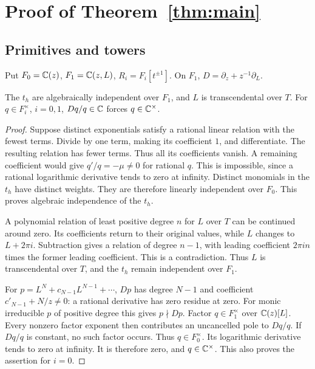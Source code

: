 \section{Proof of Theorem~\ref{thm:main}}\label{sec:proof}
\subsection{Primitives and towers}
Put $F_0=\mathbb{C}(z)$, $F_1=\mathbb{C}(z,L)$, $R_i=F_i[t^{\pm1}]$. On $F_1$, $D=\partial_z+z^{-1}\partial_L$.
\begin{lemma}\label{lem:exponential-log}
The $t_h$ are algebraically independent over $F_1$, and $L$ is
transcendental over $T$. For $q\in F_i^\times$, $i=0,1$,
$Dq/q\in\mathbb{C}$ forces $q\in\mathbb{C}^\times$.
\end{lemma}
\begin{proof}
Suppose distinct exponentials satisfy a rational linear relation with the
fewest terms. Divide by one term, making its coefficient $1$, and
differentiate. The resulting relation has fewer terms. Thus all its
coefficients vanish. A remaining coefficient would give
$q'/q=-\mu\ne0$ for rational $q$. This is impossible, since a rational
logarithmic derivative tends to zero at infinity. Distinct monomials in
the $t_h$ have distinct weights. They are therefore linearly independent
over $F_0$. This proves algebraic independence of the $t_h$.

A polynomial relation of least positive degree $n$ for $L$ over $T$
can be continued around zero. Its coefficients return to their original
values, while $L$ changes to $L+2\pi i$. Subtraction gives a relation of
degree $n-1$, with leading coefficient $2\pi in$ times the former leading
coefficient. This is a contradiction. Thus $L$ is transcendental over
$T$, and the $t_h$ remain independent over $F_1$.

For $p=L^N+c_{N-1}L^{N-1}+\cdots$, $Dp$ has degree $N-1$ and coefficient
$c'_{N-1}+N/z\ne0$: a rational derivative has zero residue at zero.
For monic irreducible $p$ of positive degree this gives $p\nmid Dp$.
Factor $q\in F_1^\times$ over $\mathbb{C}(z)[L]$. Every nonzero factor exponent
then contributes an uncancelled pole to $Dq/q$. If $Dq/q$ is constant,
no such factor occurs. Thus $q\in F_0^\times$. Its logarithmic derivative
tends to zero at infinity. It is therefore zero, and $q\in\mathbb{C}^\times$.
This also proves the assertion for $i=0$.
\end{proof}

